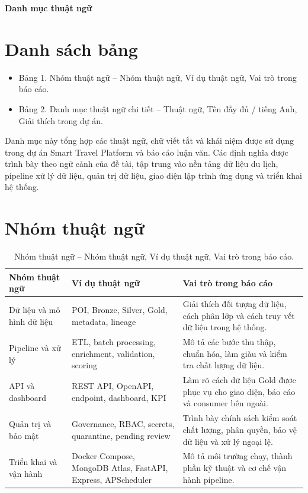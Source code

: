 \documentclass[12pt,a4paper]{article}
\begin{document}
\begin{center}
{\Large\bfseries Danh mục thuật ngữ}
\end{center}

\section*{Danh sách bảng}

\begin{itemize}
  \item Bảng 1. Nhóm thuật ngữ -- Nhóm thuật ngữ, Ví dụ thuật ngữ, Vai trò trong báo cáo.
  \item Bảng 2. Danh mục thuật ngữ chi tiết -- Thuật ngữ, Tên đầy đủ / tiếng Anh, Giải thích trong dự án.
\end{itemize}


Danh mục này tổng hợp các thuật ngữ, chữ viết tắt và khái niệm được sử dụng trong dự án Smart Travel Platform và báo cáo luận văn. Các định nghĩa được trình bày theo ngữ cảnh của đề tài, tập trung vào nền tảng dữ liệu du lịch, pipeline xử lý dữ liệu, quản trị dữ liệu, giao diện lập trình ứng dụng và triển khai hệ thống.

\section*{Nhóm thuật ngữ}

\begin{longtable}{@{}p{}p{}p{}@{}}
\caption{Nhóm thuật ngữ -- Nhóm thuật ngữ, Ví dụ thuật ngữ, Vai trò trong báo cáo.}\\
\toprule
\textbf{Nhóm thuật ngữ} & \textbf{Ví dụ thuật ngữ} & \textbf{Vai trò trong báo cáo} \\
\midrule
Dữ liệu và mô hình dữ liệu & POI, Bronze, Silver, Gold, metadata, lineage & Giải thích đối tượng dữ liệu, cách phân lớp và cách truy vết dữ liệu trong hệ thống. \\
Pipeline và xử lý & ETL, batch processing, enrichment, validation, scoring & Mô tả các bước thu thập, chuẩn hóa, làm giàu và kiểm tra chất lượng dữ liệu. \\
API và dashboard & REST API, OpenAPI, endpoint, dashboard, KPI & Làm rõ cách dữ liệu Gold được phục vụ cho giao diện, báo cáo và consumer bên ngoài. \\
Quản trị và bảo mật & Governance, RBAC, secrets, quarantine, pending review & Trình bày chính sách kiểm soát chất lượng, phân quyền, bảo vệ dữ liệu và xử lý ngoại lệ. \\
Triển khai và vận hành & Docker Compose, MongoDB Atlas, FastAPI, Express, APScheduler & Mô tả môi trường chạy, thành phần kỹ thuật và cơ chế vận hành pipeline. \\
\bottomrule
\end{longtable}
\end{document}
